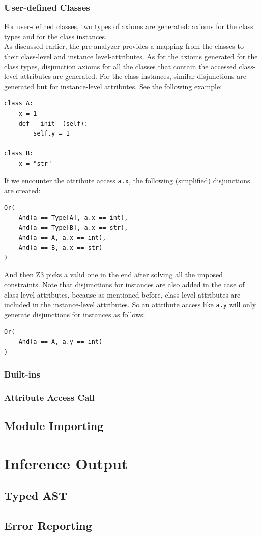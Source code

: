 \subsubsection{User-defined Classes}
For user-defined classes, two types of axioms are generated: axioms for the class types and for the class instances. \\

As discussed earlier, the pre-analyzer provides a mapping from the classes to their class-level and instance level-attributes.
As for the axioms generated for the class types, disjunction axioms for all the classes that contain the accessed class-level attributes are generated. For the class instances, similar disjunctions are generated but for instance-level attributes. See the following example:
\begin{lstlisting}
class A:
	x = 1
	def __init__(self):
		self.y = 1

class B:
	x = "str"
\end{lstlisting}

If we encounter the attribute access \lstinline|a.x|, the following (simplified) disjunctions are created:
\begin{lstlisting}
Or(
	And(a == Type[A], a.x == int),
	And(a == Type[B], a.x == str),
	And(a == A, a.x == int),
	And(a == B, a.x == str)
)
\end{lstlisting}

And then Z3 picks a valid one in the end after solving all the imposed constraints. Note that disjunctions for instances are also added in the case of class-level attributes, because as mentioned before, class-level attributes are included in the instance-level attributes. So an attribute access like \lstinline|a.y| will only generate disjunctions for instances as follows:
\begin{lstlisting}
Or(
	And(a == A, a.y == int)
)
\end{lstlisting}
\subsubsection{Built-ins}


\subsubsection{Attribute Access Call}
\subsection{Module Importing}

\section{Inference Output}
\subsection{Typed AST}
\subsection{Error Reporting}